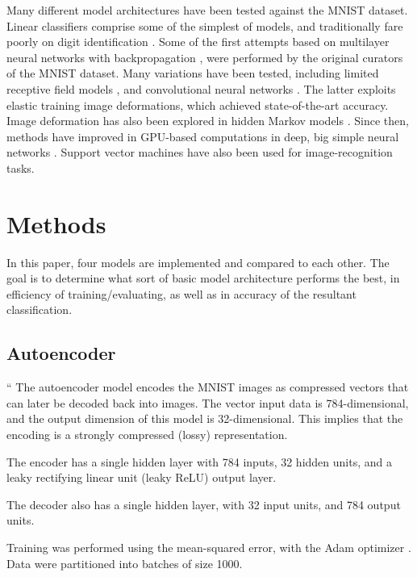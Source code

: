 \documentclass{article}
\begin{document}
Many different model architectures have been tested against the MNIST dataset.
Linear classifiers comprise some of the simplest of models, and traditionally fare poorly on digit identification
\citep{bottouComparisonClassifierMethods1994}.
Some of the first attempts based on multilayer neural networks with backpropagation \citep{bottouComparisonClassifierMethods1994, lecunGradientbasedLearningApplied1998},
were performed by the original curators of the MNIST dataset.
Many variations have been tested, including limited receptive field models \citep{kussulImprovedMethodHandwritten2004},
and convolutional neural networks \citep{simardBestPracticesConvolutional2003}.
The latter exploits elastic training image deformations, which achieved state-of-the-art accuracy.
Image deformation has also been explored in hidden Markov models \citep{keysersDeformationModelsImage2007}.
Since then, methods have improved in GPU-based computations in deep, big simple neural networks
\citep{ciresanDeepBigSimple2010, ciresanMulticolumnDeepNeural2012}.
Support vector machines \citep{decosteTrainingInvariantSupport2002} have also been used for image-recognition tasks.

\section{Methods}

In this paper, four models are implemented and compared to each other.
The goal is to determine what sort of basic model architecture performs the best,
in efficiency of training/evaluating, as well as in accuracy of the resultant classification.


\subsection{Autoencoder}
``
The autoencoder model encodes the MNIST images as compressed vectors
that can later be decoded back into images.
The vector input data is 784-dimensional, and the output dimension of this model is 32-dimensional.
This implies that the encoding is a strongly compressed (lossy) representation.

The encoder has a single hidden layer with 784 inputs, 32 hidden units, and a leaky
rectifying linear unit (leaky ReLU) output layer.

The decoder also has a single hidden layer, with 32 input units, and 784 output units.

Training was performed using the mean-squared error, with the Adam optimizer \citep{kingmaAdamMethodStochastic2017}.
Data were partitioned into batches of size 1000.
\end{document}
